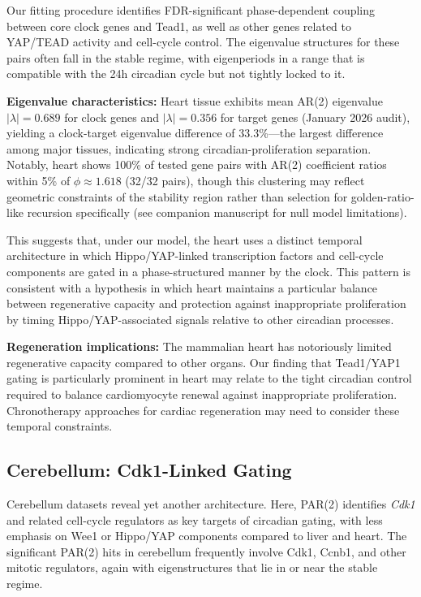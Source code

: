 \documentclass[11pt,a4paper]{article}
\begin{document}
Our fitting procedure identifies FDR-significant phase-dependent coupling between core clock genes and Tead1, as well as other genes related to YAP/TEAD activity and cell-cycle control. The eigenvalue structures for these pairs often fall in the stable regime, with eigenperiods in a range that is compatible with the 24h circadian cycle but not tightly locked to it. 

\textbf{Eigenvalue characteristics:} Heart tissue exhibits mean AR(2) eigenvalue $|\lambda| = 0.689$ for clock genes and $|\lambda| = 0.356$ for target genes (January 2026 audit), yielding a clock-target eigenvalue difference of 33.3\%---the largest difference among major tissues, indicating strong circadian-proliferation separation. Notably, heart shows 100\% of tested gene pairs with AR(2) coefficient ratios within 5\% of $\phi \approx 1.618$ (32/32 pairs), though this clustering may reflect geometric constraints of the stability region rather than selection for golden-ratio-like recursion specifically (see companion manuscript for null model limitations).

This suggests that, under our model, the heart uses a distinct temporal architecture in which Hippo/YAP-linked transcription factors and cell-cycle components are gated in a phase-structured manner by the clock. This pattern is consistent with a hypothesis in which heart maintains a particular balance between regenerative capacity and protection against inappropriate proliferation by timing Hippo/YAP-associated signals relative to other circadian processes.

\textbf{Regeneration implications:} The mammalian heart has notoriously limited regenerative capacity compared to other organs. Our finding that Tead1/YAP1 gating is particularly prominent in heart may relate to the tight circadian control required to balance cardiomyocyte renewal against inappropriate proliferation. Chronotherapy approaches for cardiac regeneration may need to consider these temporal constraints.

\subsection{Cerebellum: Cdk1-Linked Gating}

Cerebellum datasets reveal yet another architecture. Here, PAR(2) identifies \textit{Cdk1} and related cell-cycle regulators as key targets of circadian gating, with less emphasis on Wee1 or Hippo/YAP components compared to liver and heart. The significant PAR(2) hits in cerebellum frequently involve Cdk1, Ccnb1, and other mitotic regulators, again with eigenstructures that lie in or near the stable regime.
\end{document}
